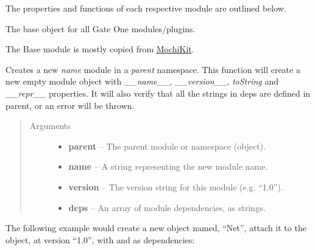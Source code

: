 \documentclass[letterpaper,10pt,openany]{sphinxmanual}
\begin{document}
The properties and functions of each respective module are outlined below.

\begin{fulllineitems}
\label{Developer/js_gateone:GateOne}
The base object for all Gate One modules/plugins.


\begin{fulllineitems}
\label{Developer/js_gateone:GateOne.Base}
The Base module is mostly copied from \href{http://mochikit.com/}{MochiKit}.


\begin{fulllineitems}
\label{Developer/js_gateone:GateOne.Base.module}
Creates a new \emph{name} module in a \emph{parent} namespace. This function will create a new empty module object with \emph{\_\_name\_\_}, \emph{\_\_version\_\_}, \emph{toString} and \emph{\_\_repr\_\_} properties. It will also verify that all the strings in deps are defined in parent, or an error will be thrown.
\begin{quote}\begin{description}
\item[{Arguments}] \leavevmode\begin{itemize}
\item {} 
\textbf{parent} -- The parent module or namespace (object).

\item {} 
\textbf{name} -- A string representing the new module name.

\item {} 
\textbf{version} -- The version string for this module (e.g. ``1.0'').

\item {} 
\textbf{deps} -- An array of module dependencies, as strings.

\end{itemize}

\end{description}\end{quote}

The following example would create a new object named, ``Net'', attach it to the {\hyperref[Developer/js_gateone:GateOne]{}} object, at version ``1.0'', with {\hyperref[Developer/js_gateone:GateOne.Base]{}} and {\hyperref[Developer/js_gateone:GateOne.Utils]{}} as dependencies:


\end{fulllineitems}
\end{fulllineitems}
\end{fulllineitems}
\end{document}
